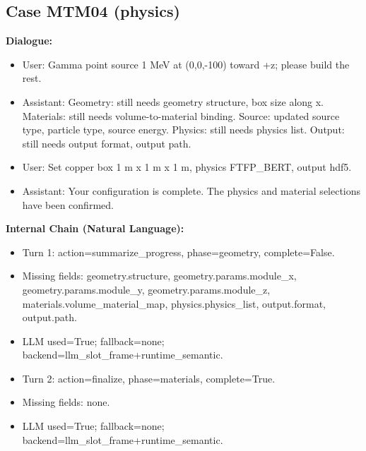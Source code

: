 \documentclass[11pt]{ctexart}
\begin{document}
\subsection{Case MTM04 (physics)}
\textbf{Dialogue:}
\begin{itemize}
\item User: Gamma point source 1 MeV at (0,0,-100) toward +z; please build the rest.
\item Assistant: Geometry: still needs geometry structure, box size along x. Materials: still needs volume-to-material binding. Source: updated source type, particle type, source energy. Physics: still needs physics list. Output: still needs output format, output path.
\item User: Set copper box 1 m x 1 m x 1 m, physics FTFP\_BERT, output hdf5.
\item Assistant: Your configuration is complete. The physics and material selections have been confirmed.
\end{itemize}
\textbf{Internal Chain (Natural Language):}
\begin{itemize}
\item Turn 1: action=summarize\_progress, phase=geometry, complete=False.
\item Missing fields: geometry.structure, geometry.params.module\_x, geometry.params.module\_y, geometry.params.module\_z, materials.volume\_material\_map, physics.physics\_list, output.format, output.path.
\item LLM used=True; fallback=none; backend=llm\_slot\_frame+runtime\_semantic.
\item Turn 2: action=finalize, phase=materials, complete=True.
\item Missing fields: none.
\item LLM used=True; fallback=none; backend=llm\_slot\_frame+runtime\_semantic.
\end{itemize}
\end{document}
